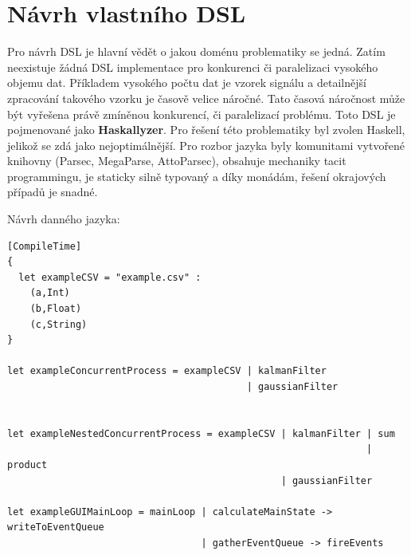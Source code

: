 \documentclass[male,czech]{kithesis}
\begin{document}
\vfill
\pagebreak
{\centering
{}
}

\chapter{Návrh vlastního DSL}
Pro návrh DSL je hlavní vědět o jakou doménu problematiky se jedná. Zatím neexistuje žádná DSL implementace pro konkurenci či paralelizaci vysokého objemu dat.
Příkladem vysokého počtu dat je vzorek signálu a detailnější zpracování takového vzorku je časově velice náročné. Tato časová náročnost může být vyřešena právě zmíněnou
konkurencí, či paralelizací problému. Toto DSL je pojmenované jako \textbf{Haskallyzer}.
Pro řešení této problematiky byl zvolen Haskell, jelikož se zdá jako nejoptimálnější. Pro rozbor jazyka byly komunitami vytvořené knihovny (Parsec, MegaParse, AttoParsec),
obsahuje mechaniky tacit programmingu, je staticky silně typovaný a díky monádám, řešení okrajových případů je snadné.

Návrh danného jazyka:

\begin{verbatim}
[CompileTime]
{
  let exampleCSV = "example.csv" :
    (a,Int)
    (b,Float)
    (c,String)
}

let exampleConcurrentProcess = exampleCSV | kalmanFilter 
                                          | gaussianFilter 
                                      

let exampleNestedConcurrentProcess = exampleCSV | kalmanFilter | sum
                                                               | product
                                                | gaussianFilter

let exampleGUIMainLoop = mainLoop | calculateMainState -> writeToEventQueue
                                  | gatherEventQueue -> fireEvents
\end{verbatim}
\end{document}
